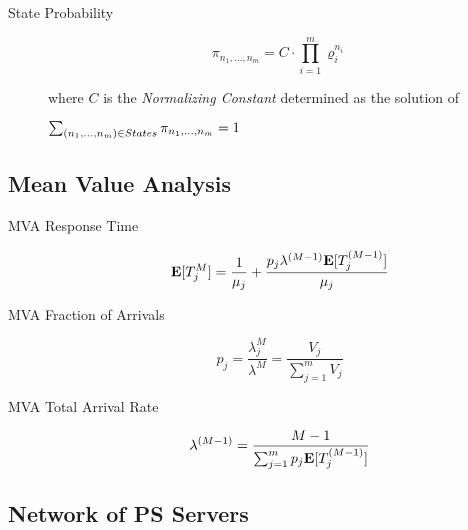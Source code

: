 \begin{description}

	\item [State Probability]
		\begin{equation}
		\pi_{n_{1},...,n_{m}} = C \cdot \prod_{i=1}^{m} \varrho_{i}^{n_{i}}
		\end{equation}
		
		where $C$ is the \textit{Normalizing Constant} determined as the solution of 
		
		$
		\sum_{(n_{1},...,n_{m}) \\ \in States} \pi_{n_{1},...,n_{m}} = 1
		$
		
\end{description}




\subsection{Mean Value Analysis}

\begin{description}

	\item [MVA Response Time]
		\begin{equation}
		\mathbf{E}[T_{j}^{M}] = 
		\frac{1}{\mu_{j}} + 
		\frac{p_{j} \lambda^{(M-1)} \mathbf{E}[T_{j}^{(M-1)}]}{\mu_{j}}
		\end{equation}
	
	\item [MVA Fraction of Arrivals]
		\begin{equation}
		p_{j} = \frac{\lambda_{j}^{M}}{\lambda^{M}} = \frac{V_{j}}{\sum_{j=1}^{m} V_{j}}
		\end{equation}
	
	\item [MVA Total Arrival Rate]
		\begin{equation}
		\lambda^{(M-1)} = \frac{M-1}{\sum_{j=1}^{m} p_{j} \mathbf{E}[T_{j}^{(M-1)}]}
		\end{equation}	

\end{description}




\subsection{Network of PS Servers}

